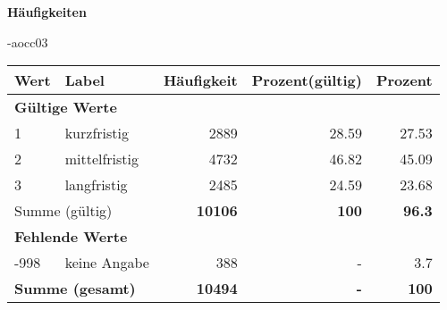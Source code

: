         		\vspace*{0.5cm}
                \noindent\textbf{Häufigkeiten}

                \vspace*{-\baselineskip}
					\begin{filecontents}{\jobname-aocc03}
					\begin{longtable}{lXrrr}
					\toprule
					\textbf{Wert} & \textbf{Label} & \textbf{Häufigkeit} & \textbf{Prozent(gültig)} & \textbf{Prozent} \\
					\endhead
					\midrule
					\multicolumn{5}{l}{\textbf{Gültige Werte}}\\

					1 &
					\multicolumn{1}{X}{ kurzfristig   } &


					  \num{2889} &
					  \num[round-mode=places,round-precision=2]{28,59} &
					    \num[round-mode=places,round-precision=2]{27,53} \\

					2 &
					\multicolumn{1}{X}{ mittelfristig   } &


					  \num{4732} &
					  \num[round-mode=places,round-precision=2]{46,82} &
					    \num[round-mode=places,round-precision=2]{45,09} \\

					3 &
					\multicolumn{1}{X}{ langfristig   } &


					  \num{2485} &
					  \num[round-mode=places,round-precision=2]{24,59} &
					    \num[round-mode=places,round-precision=2]{23,68} \\
					\midrule
					\multicolumn{2}{l}{Summe (gültig)} &
					  \textbf{\num{10106}} &
					\textbf{100} &
					  \textbf{\num[round-mode=places,round-precision=2]{96,3}} \\
					\multicolumn{5}{l}{\textbf{Fehlende Werte}}\\
							-998 &
							keine Angabe &
							  \num{388} &
							 - &
							  \num[round-mode=places,round-precision=2]{3,7} \\
					\midrule
					\multicolumn{2}{l}{\textbf{Summe (gesamt)}} &
				      \textbf{\num{10494}} &
				    \textbf{-} &
				    \textbf{100} \\
					\bottomrule
					\end{longtable}
					\end{filecontents}
